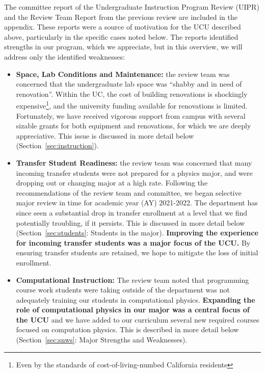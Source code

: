 \documentclass[12pt]{article}
\begin{document}
\noindent
The committee report of the Undergraduate Instruction Program Review
(UIPR) and the Review Team Report from the previous review are
included in the appendix.  These reports were a source of motivation
for the UCU described above, particularly in the specific cases noted
below.  The reports identified strengths in our program, which we
appreciate, but in this overview, we will address only the identified
weaknesses:
\begin{itemize}
 \item {\bf Space, Lab Conditions and Maintenance:} the review team
   was concerned that the undergraduate lab space was ``shabby and in
   need of renovation''.  Within the UC, the cost of building
   renovations is shockingly expensive\footnote{Even by the standards
     of cost-of-living-numbed California residents}, and the
   university funding available for renovations is limited.
   Fortunately, we have received vigorous support from campus with
   several sizable grants for both equipment and renovations, for
   which we are deeply appreciative.  This issue is discussed in more
   detail below (Section~\ref{sec:instruction}).
  
 \item {\bf Transfer Student Readiness:} the review team was concerned
   that many incoming transfer students were not prepared for a
   physics major, and were dropping out or changing major at a high
   rate.  Following the recommendations of the review team and
   committee, we began selective major review in time for academic
   year (AY) 2021-2022.  The department has since seen a substantial
   drop in transfer enrollment at a level that we find potentially
   troubling, if it persists.  This is discussed in more detail below
   (Section~\ref{sec:students}: Students in the major).  {\bf
     Improving the experience for incoming transfer students was a
     major focus of the UCU.}  By ensuring transfer students are
   retained, we hope to mitigate the loss of initial enrollment.

 \item {\bf Computational Instruction:} The review team noted that
   programming course work students were taking outside of the
   department was not adequately training our students in
   computational physics.  {\bf Expanding the role of computational
     physics in our major was a central focus of the UCU} and we have
   added to our curriculum several new required courses focused on
   computation physics.  This is described in more detail below
   (Section~\ref{sec:snws}: Major Strengths and Weaknesses).
  

\end{itemize}
\end{document}
